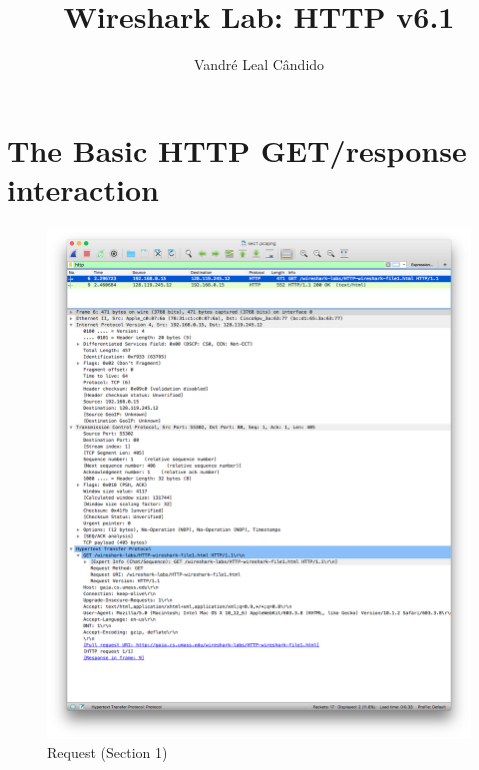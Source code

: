 \documentclass[11pt]{article}
\begin{document}
%
\author{Vandré Leal Cândido}
\title{Wireshark Lab: HTTP v6.1}
\maketitle

\section{The Basic HTTP GET/response interaction}

\begin{figure}[H]
\centering
\caption{Request (Section 1)}
\includegraphics[width=\textwidth]{01-request}
\end{figure}
\end{document}

